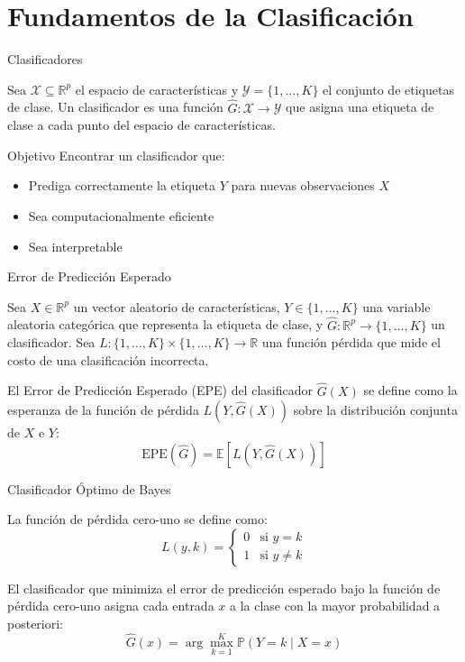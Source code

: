 \documentclass[spanish]{beamer}
\begin{document}
\section{Fundamentos de la Clasificación}

\begin{frame}{Clasificadores}
\begin{definition}[Clasificador]
Sea $\mathcal{X} \subseteq \mathbb{R}^p$ el espacio de características y $\mathcal{Y} = \{1,\ldots,K\}$ el conjunto de etiquetas de clase. Un clasificador es una función $\hat{G}: \mathcal{X} \to \mathcal{Y}$ que asigna una etiqueta de clase a cada punto del espacio de características.
\end{definition}

\begin{block}{Objetivo}
Encontrar un clasificador que:
\begin{itemize}
    \item Prediga correctamente la etiqueta $Y$ para nuevas observaciones $X$
    \item Sea computacionalmente eficiente
    \item Sea interpretable
\end{itemize}
\end{block}
\end{frame}

\begin{frame}{Error de Predicción Esperado}

\begin{definition}
Sea $X \in \mathbb{R}^p$ un vector aleatorio de características, $Y \in \{1,\ldots,K\}$ una variable aleatoria categórica que representa la etiqueta de clase, y $\hat{G}: \mathbb{R}^p \to \{1,\ldots,K\}$ un clasificador. Sea $L: \{1,\ldots,K\} \times \{1,\ldots,K\} \to \mathbb{R}$ una función pérdida que mide el costo de una clasificación incorrecta.

El Error de Predicción Esperado (EPE) del clasificador $\hat{G}(X)$ se define como la esperanza de la función de pérdida $L(Y, \hat{G}(X))$ sobre la distribución conjunta de $X$ e $Y$:
\[
\text{EPE}(\hat{G}) = \mathbb{E}[L(Y, \hat{G}(X))]
\]
\end{definition}
\end{frame}

\begin{frame}{Clasificador Óptimo de Bayes}
\begin{definition}
La función de pérdida cero-uno se define como:
\[
L(y, k) = \begin{cases}
0 & \text{si } y = k \\
1 & \text{si } y \neq k
\end{cases}
\]
\end{definition}
\begin{theorem}
El clasificador que minimiza el error de predicción esperado bajo la función de pérdida cero-uno asigna cada entrada $x$ a la clase con la mayor probabilidad a posteriori:
\[
\hat{G}(x) = \arg\max_{k=1}^K \mathbb{P}(Y = k \mid X = x)
\]
\end{theorem}
\end{frame}
\end{document}
